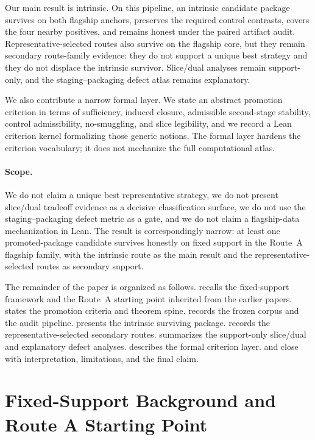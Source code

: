 \documentclass[11pt]{article}
\theoremstyle{definition}
\begin{document}
Our main result is intrinsic. On this pipeline, an intrinsic candidate package survives on both flagship anchors, preserves the required control contrasts, covers the four nearby positives, and remains honest under the paired artifact audit. Representative-selected routes also survive on the flagship core, but they remain secondary route-family evidence: they do not support a unique best strategy and they do not displace the intrinsic survivor. Slice/dual analyses remain support-only, and the staging--packaging defect atlas remains explanatory.

We also contribute a narrow formal layer. We state an abstract promotion criterion in terms of sufficiency, induced closure, admissible second-stage stability, control admissibility, no-smuggling, and slice legibility, and we record a Lean criterion kernel formalizing those generic notions. The formal layer hardens the criterion vocabulary; it does not mechanize the full computational atlas.

\paragraph{Scope.} We do not claim a unique best representative strategy, we do not present slice/dual tradeoff evidence as a decisive classification surface, we do not use the staging--packaging defect metric as a gate, and we do not claim a flagship-data mechanization in Lean. The result is correspondingly narrow: at least one promoted-package candidate survives honestly on fixed support in the Route~A flagship family, with the intrinsic route as the main result and the representative-selected routes as secondary support.

The remainder of the paper is organized as follows.  recalls the fixed-support framework and the Route~A starting point inherited from the earlier papers.  states the promotion criteria and theorem spine.  records the frozen corpus and the audit pipeline.  presents the intrinsic surviving package.  records the representative-selected secondary routes.  summarizes the support-only slice/dual and explanatory defect analyses.  describes the formal criterion layer.  and  close with interpretation, limitations, and the final claim.
 \section{Fixed-Support Background and Route A Starting Point}\label{sec:background}
\end{document}
